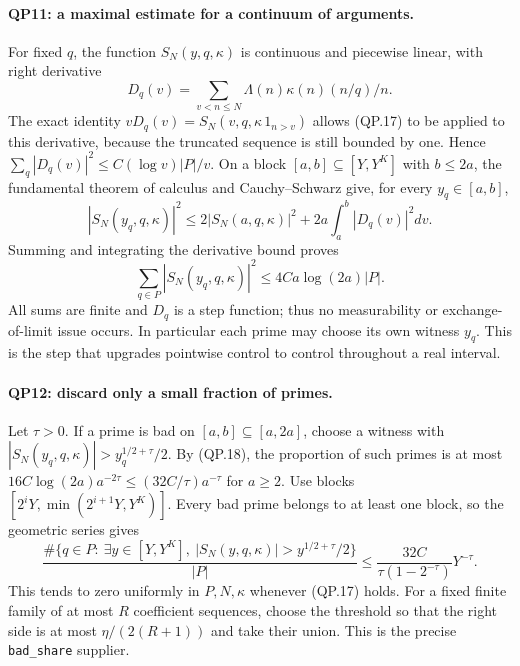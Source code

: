 \paragraph{QP11: a maximal estimate for a continuum of arguments.}
For fixed $q$, the function $S_N(y,q,\kappa)$ is continuous and piecewise
linear, with right derivative
\[
 D_q(v)=\sum_{v<n\le N}\Lambda(n)\kappa(n)(n/q)/n.
\]
The exact identity
$vD_q(v)=S_N(v,q,\kappa\,1_{n>v})$
allows (QP.17) to be applied to this derivative, because the truncated
sequence is still bounded by one.  Hence
$\sum_q|D_q(v)|^2\le C(\log v)|P|/v$.
On a block $[a,b]\subseteq[Y,Y^K]$ with $b\le2a$, the fundamental
theorem of calculus and Cauchy--Schwarz give, for every $y_q\in[a,b]$,
\[
 |S_N(y_q,q,\kappa)|^2
 \le2|S_N(a,q,\kappa)|^2+2a\int_a^b|D_q(v)|^2dv.
\]
Summing and integrating the derivative bound proves
\[
 \sum_{q\in P}|S_N(y_q,q,\kappa)|^2
                                  \le4Ca\log(2a)|P|.\tag{QP.18}
\]
All sums are finite and $D_q$ is a step function; thus no measurability
or exchange-of-limit issue occurs.  In particular each prime may choose
its own witness $y_q$.  This is the step that upgrades pointwise control
to control throughout a real interval.

\paragraph{QP12: discard only a small fraction of primes.}
Let $\tau>0$.  If a prime is bad on $[a,b]\subseteq[a,2a]$, choose a
witness with $|S_N(y_q,q,\kappa)|>y_q^{1/2+\tau}/2$.
By (QP.18), the proportion of such primes is at most
$16C\log(2a)a^{-2\tau}\le(32C/\tau)a^{-\tau}$ for $a\ge2$.
Use blocks $[2^iY,\min(2^{i+1}Y,Y^K)]$.
Every bad prime belongs to at least one block, so the geometric series
gives
\[
 \frac{\#\{q\in P:\ \exists y\in[Y,Y^K],\
                    |S_N(y,q,\kappa)|>y^{1/2+\tau}/2\}}{|P|}
 \le \frac{32C}{\tau(1-2^{-\tau})}Y^{-\tau}.          \tag{QP.19}
\]
This tends to zero uniformly in $P,N,\kappa$ whenever (QP.17) holds.
For a fixed finite family of at most $R$ coefficient sequences, choose
the threshold so that the right side is at most $\eta/(2(R+1))$ and
take their union.  This is the precise \texttt{bad\_share} supplier.

